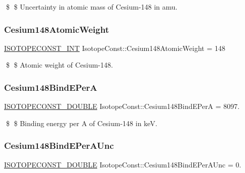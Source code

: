 \$ \$ Uncertainty in atomic mass of Cesium-\/148 in amu. \mbox{\label{group___isotope_const-_cesium-_cs148_gacec8341b2f264ab4a0547c7cbd7ab1b8}} 
\subsubsection{\texorpdfstring{Cesium148\+Atomic\+Weight}{Cesium148AtomicWeight}}
{\footnotesize\ttfamily \mbox{\hyperlink{group___isotope_const-_macros_ga5f18360b3e99483a35c32d789e62621c}{I\+S\+O\+T\+O\+P\+E\+C\+O\+N\+S\+T\+\_\+\+I\+NT}} Isotope\+Const\+::\+Cesium148\+Atomic\+Weight = 148}

\$ \$ Atomic weight of Cesium-\/148. \mbox{\label{group___isotope_const-_cesium-_cs148_ga54ee78d3797f9bb0786d86f68276bcd7}} 
\subsubsection{\texorpdfstring{Cesium148\+Bind\+E\+PerA}{Cesium148BindEPerA}}
{\footnotesize\ttfamily \mbox{\hyperlink{group___isotope_const-_macros_ga8f45a7272ce02c0b4c65c44636ed719a}{I\+S\+O\+T\+O\+P\+E\+C\+O\+N\+S\+T\+\_\+\+D\+O\+U\+B\+LE}} Isotope\+Const\+::\+Cesium148\+Bind\+E\+PerA = 8097.}

\$ \$ Binding energy per A of Cesium-\/148 in keV. \mbox{\label{group___isotope_const-_cesium-_cs148_ga0df169f381e1a5a214fa5f52443800ed}} 
\subsubsection{\texorpdfstring{Cesium148\+Bind\+E\+Per\+A\+Unc}{Cesium148BindEPerAUnc}}
{\footnotesize\ttfamily \mbox{\hyperlink{group___isotope_const-_macros_ga8f45a7272ce02c0b4c65c44636ed719a}{I\+S\+O\+T\+O\+P\+E\+C\+O\+N\+S\+T\+\_\+\+D\+O\+U\+B\+LE}} Isotope\+Const\+::\+Cesium148\+Bind\+E\+Per\+A\+Unc = 0.}

